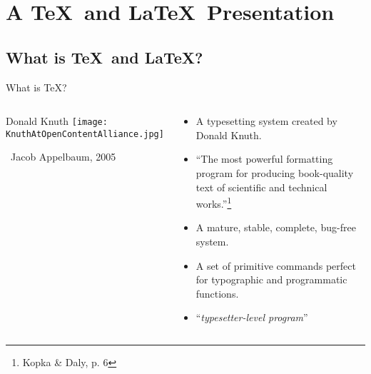 \small

\section{A \TeX\ and \LaTeX\ Presentation}

\subsection{What is \TeX\ and \LaTeX?}

\begin{frame}{What is \TeX?}
	\begin{columns}
		\begin{HEClegende}{Donald Knuth}
			\texttt{[image: KnuthAtOpenContentAlliance.jpg]}
			
			{\tiny\faCreativeCommons\ Jacob Appelbaum, 2005}
		\end{HEClegende}
		\begin{HECcontenuLegende}
			\begin{itemize}
				\item A typesetting system created by Donald Knuth.
				\item ``The most powerful formatting program for producing book-quality text of scientific and technical works.''\footnote{Kopka \& Daly, p. 6}
				\item A mature, stable, complete, bug-free system.
				\item A set of primitive commands perfect for typographic and programmatic functions.
				\item ``\emph{typesetter-level program}''
			\end{itemize}
		\end{HECcontenuLegende}
	\end{columns}
\end{frame}

